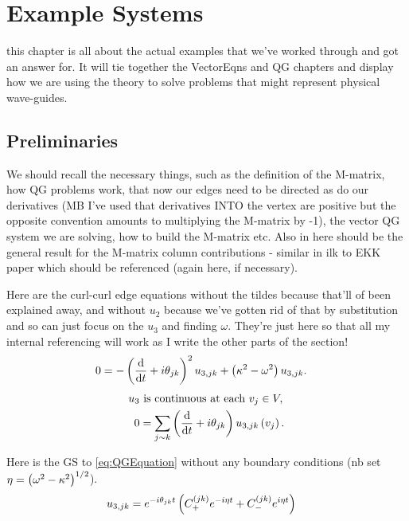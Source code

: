 \chapter{Example Systems} \label{ch:ExampleSystems}
this chapter is all about the actual examples that we've worked through and got an answer for.
It will tie together the VectorEqns and QG chapters and display how we are using the theory to solve problems that might represent physical wave-guides.

\section{Preliminaries}
We should recall the necessary things, such as the definition of the M-matrix, how QG problems work, that now our edges need to be directed as do our derivatives (MB I've used that derivatives INTO the vertex are positive but the opposite convention amounts to multiplying the M-matrix by -1), the vector QG system we are solving, how to build the M-matrix etc.
Also in here should be the general result for the M-matrix column contributions - similar in ilk to EKK paper which should be referenced (again here, if necessary).

Here are the curl-curl edge equations without the tildes because that'll of been explained away, and without $u_2$ because we've gotten rid of that by substitution and so can just focus on the $u_3$ and finding $\omega$. 
They're just here so that all my internal referencing will work as I write the other parts of the section!
\begin{align} \label{eq:QGEquation}
	0 &= -\left( \dfrac{\mathrm{d}}{\mathrm{d}t} + i\theta_{jk} \right)^2 u_{3,jk} + \left( \kappa^2 - \omega^2 \right)u_{3,jk}.
\end{align}
\begin{subequations} \label{eq:QGVertexConditions}
	\begin{align}
		u_3 &\text{ is continuous at each } v_j\in V, \\
		0 &= \sum_{j\sim k} \left( \dfrac{\mathrm{d}}{\mathrm{d}t} + i\theta_{jk} \right)u_{3,jk}\left( v_j \right).
	\end{align}
\end{subequations}

Here is the GS to \eqref{eq:QGEquation} without any boundary conditions (nb set $\eta = \left( \omega^2-\kappa^2 \right)^{1/2}$).
\begin{align*}
	u_{3,jk} &= e^{-i\theta_{jk}t}\left(  C_{+}^{(jk)}e^{-i\eta t} + C_{-}^{(jk)}e^{i\eta t}  \right)
\end{align*}

